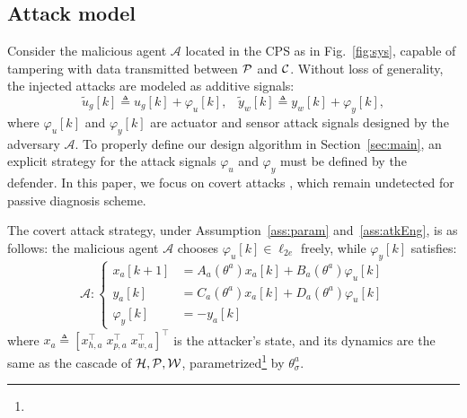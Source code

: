 \subsection{Attack model}\label{ch:probFor:atk}
Consider the malicious agent $\mathcal A$ located in the CPS as in Fig.~\ref{fig:sys}, capable of tampering with data transmitted between $\mathcal{P}$ and $\mathcal{C}$. 
Without loss of generality, the injected attacks are modeled as additive signals:
 \begin{equation}\label{eq:atk}
     \tilde{u}_g[k] \triangleq u_g[k] + \varphi_u[k],\;\;\; \tilde{y}_w[k] \triangleq y_w[k] + \varphi_y[k],
 \end{equation}
where $\varphi_u[k]$ and $\varphi_y[k]$ are actuator and sensor attack signals designed by the adversary $\mathcal A$. To properly define our design algorithm in Section~\ref{sec:main}, an explicit strategy for the attack signals $\varphi_u$ and $\varphi_y$ must be defined by the defender. %
In this paper, we focus on covert attacks \citep{smith2015covert}, which remain undetected for passive diagnosis scheme.


The covert attack strategy, under Assumption~\ref{ass:param} and~\ref{ass:atkEng}, is as follows: the malicious agent $\mathcal A$ chooses $\varphi_u[k] \in \ell_{2e}$ freely, while $\varphi_y[k]$ satisfies:
\begin{equation}\label{eq:atk:cov}
	\mathcal A:
\left\{
\begin{aligned}
    x_a[k+1] &= A_a(\theta^a) x_a[k] + B_a(\theta^a) \varphi_u[k]\\
		y_a[k] &= C_a(\theta^a) x_a[k] + D_a(\theta^a) \varphi_u[k]\\
		\varphi_y[k] &= - y_a[k]
\end{aligned}
\right.
\end{equation}
where $x_a \triangleq [x_{h,a}^\top\;x_{p,a}^\top\;x_{w,a}^\top]^\top$ is the attacker's state, and its dynamics are the same as the cascade of $\mathcal{H}, \mathcal{P}, \mathcal{W}$, parametrized\footnote{} by $\theta^a_\sigma$.

